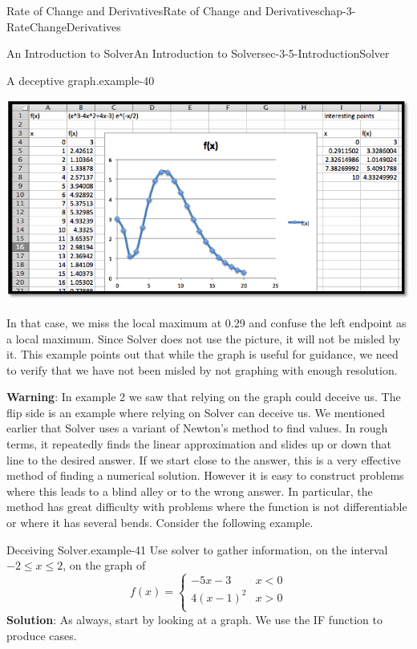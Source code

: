 \documentclass[oneside,10pt,]{book}
\newcommand{\terminology}[1]{\textbf{#1}}
\numberwithin{equation}{section}
\newcommand{\lt}{<}
\newcommand{\gt}{>}
\begin{document}
\begin{chapterptx}{Rate of Change and Derivatives}{}{Rate of Change and Derivatives}{}{}{chap-3-RateChangeDerivatives}
\begin{sectionptx}{An Introduction to Solver}{}{An Introduction to Solver}{}{}{sec-3-5-IntroductionSolver}
\begin{example}{A deceptive graph.}{example-40}
\begin{sidebyside}{1}{0}{0}{0}
\begin{sbspanel}{1}
\includegraphics[width=1\linewidth]{images/sec3-5-12.png}
\end{sbspanel}%
\end{sidebyside}%
\par
\hypertarget{p-1348}{}%
In that case, we miss the local maximum at 0.29 and confuse the left endpoint as a local maximum.  Since Solver does not use the picture, it will not be misled by it.  This example points out that while the graph is useful for guidance, we need to verify that we have not been misled by not graphing with enough resolution.%
\end{example}
\hypertarget{p-1349}{}%
\terminology{Warning}: In example 2 we saw that relying on the graph could deceive us.  The flip side is an example where relying on Solver can deceive us. We mentioned earlier that Solver uses a variant of Newton’s method to find values.  In rough terms, it repeatedly finds the linear approximation and slides up or down that line to the desired answer.  If we start close to the answer, this is a very effective method of finding a numerical solution.  However it is easy to construct problems where this leads to a blind alley or to the wrong answer.  In particular, the method has great difficulty with problems where the function is not differentiable or where it has several bends.  Consider the following example.%
\begin{example}{Deceiving Solver.}{example-41}%
\hypertarget{p-1350}{}%
Use solver to gather information, on the interval \(-2\le x\le 2\), on the graph of%
%
\begin{equation*}
f(x)=\begin{cases}
-5x-3& x\lt 0\\
4(x-1)^2 &x \gt 0\\
\end{cases}
\end{equation*}
\hypertarget{p-1351}{}%
\terminology{Solution}:  As always, start by looking at a graph.  We use the IF function to produce cases.%

\end{example}
\end{sectionptx}
\end{chapterptx}
\end{document}
